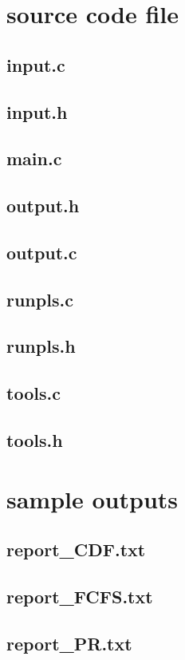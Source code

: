 \documentclass{ieeeaccess}
\begin{document}
\appendices
\section{\break source code file}
\subsection{input.c}

\subsection{input.h}

\subsection{main.c}

\subsection{output.h}

\subsection{output.c}

\subsection{runpls.c}

\subsection{runpls.h}

\subsection{tools.c}

\subsection{tools.h}


\section{\break sample outputs}

\subsection{report\_CDF.txt}

\subsection{report\_FCFS.txt}

\subsection{report\_PR.txt}


\EOD
\end{document}
